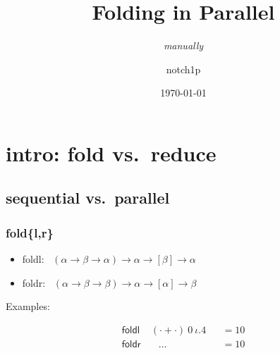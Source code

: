 \documentclass{beamer}
\title{Folding in Parallel}
\subtitle{\textit{manually}}
\date{\today}
\author{notch1p}
\begin{document}
\frame{\titlepage}
\section{intro: fold vs.\ reduce}
\subsection{sequential vs.\ parallel}
\begin{frame}
    \frametitle{fold\{l,r\}}
    \begin{itemize}
        \item \textsf{foldl}: \ $(\alpha\to\beta\to\alpha)\to\alpha\to[\beta]\to\alpha$
        \item \textsf{foldr}: \ $(\alpha\to\beta\to\beta)\to\alpha\to[\alpha]\to\beta$
    \end{itemize}

    Examples:

    \begin{align*}
        \mathsf{foldl} & \ (\cdot + \cdot)\ 0\ \iota.4 &  & = 10 \\
        \mathsf{foldr} & \quad \ldots                  &  & = 10
    \end{align*}

\end{frame}
\end{document}
